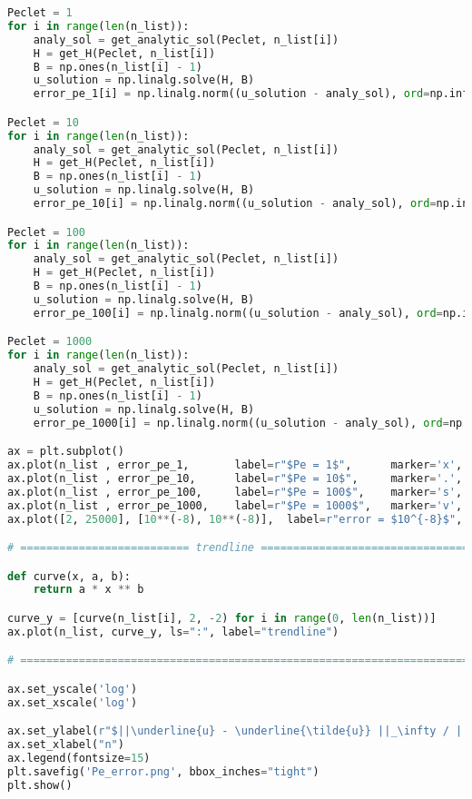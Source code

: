 \documentclass[11pt,letterpaper]{article}
\begin{document}
\begin{lstlisting}[language=Python, caption=Qusetion 1 Python code]
Peclet = 1
for i in range(len(n_list)):
    analy_sol = get_analytic_sol(Peclet, n_list[i])
    H = get_H(Peclet, n_list[i])
    B = np.ones(n_list[i] - 1)
    u_solution = np.linalg.solve(H, B)
    error_pe_1[i] = np.linalg.norm((u_solution - analy_sol), ord=np.inf) / np.linalg.norm(analy_sol, ord=np.inf)

Peclet = 10
for i in range(len(n_list)):
    analy_sol = get_analytic_sol(Peclet, n_list[i])
    H = get_H(Peclet, n_list[i])
    B = np.ones(n_list[i] - 1)
    u_solution = np.linalg.solve(H, B)
    error_pe_10[i] = np.linalg.norm((u_solution - analy_sol), ord=np.inf) / np.linalg.norm(analy_sol, ord=np.inf)

Peclet = 100
for i in range(len(n_list)):
    analy_sol = get_analytic_sol(Peclet, n_list[i])
    H = get_H(Peclet, n_list[i])
    B = np.ones(n_list[i] - 1)
    u_solution = np.linalg.solve(H, B)
    error_pe_100[i] = np.linalg.norm((u_solution - analy_sol), ord=np.inf) / np.linalg.norm(analy_sol, ord=np.inf)

Peclet = 1000
for i in range(len(n_list)):
    analy_sol = get_analytic_sol(Peclet, n_list[i])
    H = get_H(Peclet, n_list[i])
    B = np.ones(n_list[i] - 1)
    u_solution = np.linalg.solve(H, B)
    error_pe_1000[i] = np.linalg.norm((u_solution - analy_sol), ord=np.inf) / np.linalg.norm(analy_sol, ord=np.inf)

ax = plt.subplot()
ax.plot(n_list , error_pe_1,       label=r"$Pe = 1$",      marker='x', lw = linewide)
ax.plot(n_list , error_pe_10,      label=r"$Pe = 10$",     marker='.', lw = linewide)
ax.plot(n_list , error_pe_100,     label=r"$Pe = 100$",    marker='s', lw = linewide)
ax.plot(n_list , error_pe_1000,    label=r"$Pe = 1000$",   marker='v', lw = linewide)
ax.plot([2, 25000], [10**(-8), 10**(-8)],  label=r"error = $10^{-8}$", lw = linewide, c='black', ls='-.')

# ========================== trendline ================================

def curve(x, a, b):
    return a * x ** b

curve_y = [curve(n_list[i], 2, -2) for i in range(0, len(n_list))]
ax.plot(n_list, curve_y, ls=":", label="trendline")

# =====================================================================

ax.set_yscale('log')
ax.set_xscale('log')

ax.set_ylabel(r"$||\underline{u} - \underline{\tilde{u}} ||_\infty / ||\underline{\tilde{u}}||  $")
ax.set_xlabel("n")
ax.legend(fontsize=15)
plt.savefig('Pe_error.png', bbox_inches="tight")
plt.show()
\end{lstlisting}
\end{document}
